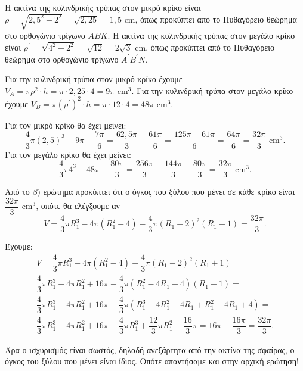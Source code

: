 
\begin{alist}
\item
\begin{rlist}
\item Η ακτίνα της κυλινδρικής τρύπας στον μικρό κρίκο είναι $\rho = \sqrt{2,5^2 - 2^2} = \sqrt{2,25} = 1,5\text{ cm}$, όπως προκύπτει από το Πυθαγόρειο θεώρημα στο ορθογώνιο τρίγωνο $ABK$.
Η ακτίνα της κυλινδρικής τρύπας στον μεγάλο κρίκο είναι $\rho^\prime = \sqrt{4^2 - 2^2} = \sqrt{12} = 2\sqrt{3}\text{ cm}$, όπως προκύπτει από το Πυθαγόρειο θεώρημα στο ορθογώνιο τρίγωνο $A^\prime B^\prime N$.
\item Για την κυλινδρική τρύπα στον μικρό κρίκο έχουμε $V_A = \pi \rho^2 \cdot h = \pi \cdot 2,25 \cdot 4 = 9\pi \text{ cm}^3$.
Για την κυλινδρική τρύπα στον μεγάλο κρίκο έχουμε $V_B = \pi (\rho^\prime)^2 \cdot h = \pi \cdot 12 \cdot 4 = 48\pi \text{ cm}^3$.
\end{rlist}

\item
\begin{rlist}
\item Για τον μικρό κρίκο θα έχει μείνει:
\[\dfrac{4}{3}\pi (2,5)^3 - 9\pi - \dfrac{7\pi}{6} = \dfrac{62,5\pi}{3} - \dfrac{61\pi}{6} = \dfrac{125\pi - 61\pi}{6} = \dfrac{64\pi}{6} = \dfrac{32\pi}{3}\text{ cm}^3.\]
Για τον μεγάλο κρίκο θα έχει μείνει:
\[\dfrac{4}{3}\pi 4^3 - 48\pi - \dfrac{80\pi}{3} = \dfrac{256\pi}{3} - \dfrac{144\pi}{3} - \dfrac{80\pi}{3} = \dfrac{32\pi}{3}\text{ cm}^3.\]
\item Από το $\beta)$ ερώτημα προκύπτει ότι ο όγκος του ξύλου που μένει σε κάθε κρίκο είναι $\dfrac{32\pi}{3} \text{ cm}^3$, οπότε θα ελέγξουμε αν
\[V = \dfrac{4}{3}\pi R_1^3 - 4\pi(R_1^2 - 4) - \dfrac{4}{3}\pi(R_1 - 2)^2 (R_1 + 1) = \dfrac{32\pi}{3}.\]

Έχουμε:
\begin{gather*}
V = \dfrac{4}{3}\pi R_1^3 - 4\pi(R_1^2 - 4) - \dfrac{4}{3}\pi(R_1 - 2)^2 (R_1 + 1) = \\
\dfrac{4}{3}\pi R_1^3 - 4\pi R_1^2 + 16\pi - \dfrac{4}{3}\pi(R_1^2 - 4R_1 + 4)(R_1 + 1) = \\
\dfrac{4}{3}\pi R_1^3 - 4\pi R_1^2 + 16\pi - \dfrac{4}{3}\pi(R_1^3 - 4R_1^2 + 4R_1 + R_1^2 - 4R_1 + 4) = \\
\dfrac{4}{3}\pi R_1^3 - 4\pi R_1^2 + 16\pi - \dfrac{4}{3}\pi R_1^3 + \dfrac{12}{3}\pi R_1^2 - \dfrac{16}{3}\pi = 16\pi - \dfrac{16\pi}{3} = \dfrac{32\pi}{3}.
\end{gather*}

Άρα ο ισχυρισμός είναι σωστός, δηλαδή ανεξάρτητα από την ακτίνα της σφαίρας, ο όγκος του ξύλου που μένει είναι ίδιος. Οπότε απαντήσαμε και στην αρχική ερώτηση!
\end{rlist}
\end{alist}

